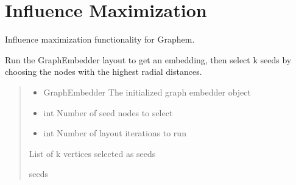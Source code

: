 \documentclass[letterpaper,10pt,english]{sphinxmanual}
\begin{document}
\section{Influence Maximization}
\label{\detokenize{api_reference:module-graphem.influence}}\label{\detokenize{api_reference:influence-maximization}}
\sphinxAtStartPar
Influence maximization functionality for Graphem.

\begin{fulllineitems}
\label{\detokenize{api_reference:graphem.influence.graphem_seed_selection}}
\pysigstartsignatures
{}
\pysigstopsignatures
\sphinxAtStartPar
Run the GraphEmbedder layout to get an embedding, then select
k seeds by choosing the nodes with the highest radial distances.
\begin{quote}\begin{description}
\begin{itemize}
\item {} 
\sphinxAtStartPar
{} \textendash{} GraphEmbedder
The initialized graph embedder object

\item {} 
\sphinxAtStartPar
{} \textendash{} int
Number of seed nodes to select

\item {} 
\sphinxAtStartPar
{} \textendash{} int
Number of layout iterations to run

\end{itemize}

\sphinxAtStartPar
\begin{description}
\sphinxAtStartPar
List of k vertices selected as seeds

\end{description}


\sphinxAtStartPar
seeds

\end{description}\end{quote}

\end{fulllineitems}
\end{document}
